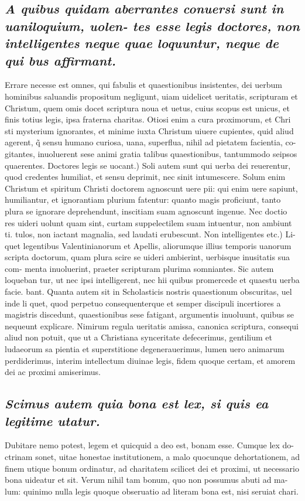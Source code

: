 \documentclass{article}
\begin{document}
\begin{pages}
\subsection*{\textit{A quibus quidam aberrantes conuersi sunt in uaniloquium, uolen- tes esse legis doctores, non intelligentes neque quae loquuntur, neque de qui bus affirmant. }}\pstart Errare necesse est omnes, qui fabulis et quaestionibus insistentes, dei uerbum hominibus saluandis propositum negligunt, uiam uidelicet ueritatis, scripturam et Christum, quem omis docet scriptura noua et uetus, cuius scopus est unicus, et finis totius legis, ipsa fraterna charitas. Otiosi enim a cura proximorum, et Chri sti mysterium ignorantes, et minime iuxta Christum uiuere cupientes, quid aliud agerent, q̃ sensu humano curiosa, uana, superflua, nihil ad pietatem facientia, co- gitantes, inuoluerent sese animi gratia talibus quaestionibus, tantummodo seipsos quaerentes. Doctores legis se uocant.) Soli autem sunt qui uerba dei reuerentur, quod credentes humiliat, et sensu deprimit, nec sinit intumescere. Solum enim Christum et spiritum Christi doctorem agnoscunt uere pii: qui enim uere sapiunt, humiliantur, et ignorantiam plurium fatentur: quanto magis proficiunt, tanto plura se ignorare deprehendunt, inscitiam suam agnoscunt ingenue. Nec doctio res uideri uolunt quam sint, curtam suppelectilem suam intuentur, non ambiunt ti. tulos, non iactant magnalia, sed laudati erubescunt. Non intelligentes etc.) Li- quet legentibus Valentinianorum et Apellis, aliorumque illius temporis uanorum scripta doctorum, quam plura scire se uideri ambierint, uerbisque inusitatis sua com- menta inuoluerint, praeter scripturam plurima somniantes. Sic autem loqueban tur, ut nec ipsi intelligerent, nec hii quibus promercede et quaestu uerba facie. bant. Quanta autem sit in Scholasticis nostris quaestionum obscuritas, uel inde li quet, quod perpetuo consequenterque et semper discipuli incertiores a magistris discedunt, quaestionibus sese fatigant, argumentis inuoluunt, quibus se nequeunt explicare. Nimirum regula ueritatis amissa, canonica scriptura, consequi aliud non potuit, que ut a Christiana synceritate defecerimus, gentilium et ludaeorum sa pientia et superstitione degenerauerimus, lumen uero animarum perdiderimus, interim intellectum diuinae legis, fidem quoque certam, et amorem dei ac proximi amiserimus.  \pend
{}
{}
\subsection*{\textit{Scimus autem quia bona est lex, si quis ea legitime utatur. }}\pstart Dubitare nemo potest, legem et quicquid a deo est, bonam esse. Cumque lex do- ctrinam sonet, uitae honestae institutionem, a malo quocunque dehortationem, ad finem utique bonum ordinatur, ad charitatem scilicet dei et proximi, ut necessario bona uideatur et sit. Verum nihil tam bonum, quo non possumus abuti ad ma- lum: quinimo nulla legis quoque obseruatio ad literam bona est, nisi seruiat chari.  \pend

\end{pages}
\end{document}
